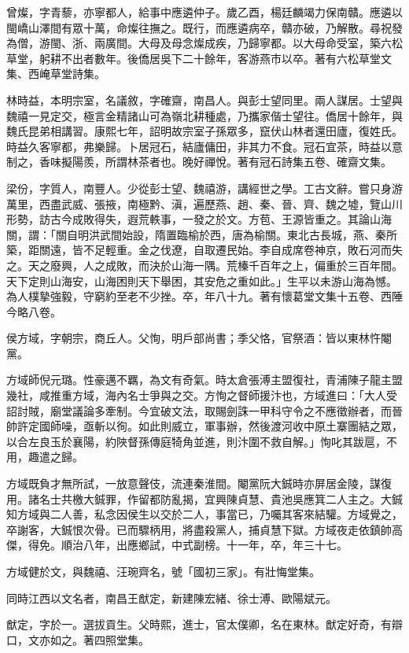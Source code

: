\begin{pinyinscope}
曾燦，字青藜，亦寧都人，給事中應遴仲子。歲乙酉，楊廷麟竭力保南贛。應遴以閩嶠山澤間有眾十萬，命燦往撫之。既行，而應遴病卒，贛亦破，乃解散。尋祝發為僧，游閩、浙、兩廣間。大母及母念燦成疾，乃歸寧都。以大母命受室，築六松草堂，躬耕不出者數年。後僑居吳下二十餘年，客游燕市以卒。著有六松草堂文集、西崦草堂詩集。

林時益，本明宗室，名議敘，字確齋，南昌人。與彭士望同里。兩人謀居。士望與魏禧一見定交，極言金精諸山可為嶺北耕種處，乃攜家偕士望往。僑居十餘年，與魏氏昆弟相講習。康熙七年，詔明故宗室子孫眾多，竄伏山林者還田廬，復姓氏。時益久客寧都，弗樂歸。卜居冠石，結廬傭田，非其力不食。冠石宜茶，時益以意制之，香味擬陽羨，所謂林茶者也。晚好禪悅。著有冠石詩集五卷、確齋文集。

梁份，字質人，南豐人。少從彭士望、魏禧游，講經世之學。工古文辭。嘗只身游萬里，西盡武威、張掖，南極黔、滇，遍歷燕、趙、秦、晉、齊、魏之墟，覽山川形勢，訪古今成敗得失，遐荒軼事，一發之於文。方苞、王源皆重之。其論山海關，謂：「關自明洪武間始設，隋置臨榆於西，唐為榆關。東北古長城，燕、秦所築，距關遠，皆不足輕重。金之伐遼，自取遷民始。李自成席卷神京，敗石河而失之。天之廢興，人之成敗，而決於山海一隅。荒榛千百年之上，偏重於三百年間。天下定則山海安，山海困則天下舉困，其安危之重如此。」生平以未游山海為憾。為人樸摯強毅，守窮約至老不少挫。卒，年八十九。著有懷葛堂文集十五卷、西陲今略八卷。

侯方域，字朝宗，商丘人。父恂，明戶部尚書；季父恪，官祭酒：皆以東林忤閹黨。

方域師倪元璐。性豪邁不羈，為文有奇氣。時太倉張溥主盟復社，青浦陳子龍主盟幾社，咸推重方域，海內名士爭與之交。方恂之督師援汴也，方域進曰：「大人受詔討賊，廟堂議論多牽制。今宜破文法，取賜劍誅一甲科守令之不應徵辦者，而晉帥許定國師噪，亟斬以徇。如此則威立，軍事辦，然後渡河收中原土寨團結之眾，以合左良玉於襄陽，約陜督孫傳庭犄角並進，則汴圍不救自解。」恂叱其跋扈，不用，趣遣之歸。

方域既負才無所試，一放意聲伎，流連秦淮間。閹黨阮大鋮時亦屏居金陵，謀復用。諸名士共檄大鋮罪，作留都防亂揭，宜興陳貞慧、貴池吳應箕二人主之。大鋮知方域與二人善，私念因侯生以交於二人，事當已，乃囑其客來結驩。方域覺之，卒謝客，大鋮恨次骨。已而驟柄用，將盡殺黨人，捕貞慧下獄。方域夜走依鎮帥高傑，得免。順治八年，出應鄉試，中式副榜。十一年，卒，年三十七。

方域健於文，與魏禧、汪琬齊名，號「國初三家」。有壯悔堂集。

同時江西以文名者，南昌王猷定，新建陳宏緒、徐士溥、歐陽斌元。

猷定，字於一。選拔貢生。父時熙，進士，官太僕卿，名在東林。猷定好奇，有辯口，文亦如之。著四照堂集。


\end{pinyinscope}
